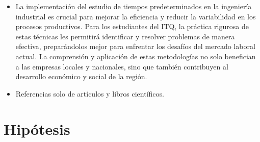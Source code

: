 \begin{itemize}
    \item La implementación del estudio de tiempos predeterminados en la ingeniería industrial es crucial para mejorar la eficiencia y reducir la variabilidad en los procesos productivos. Para los estudiantes del ITQ, la práctica rigurosa de estas técnicas les permitirá identificar y resolver problemas de manera efectiva, preparándolos mejor para enfrentar los desafíos del mercado laboral actual. La comprensión y aplicación de estas metodologías no solo benefician a las empresas locales y nacionales, sino que también contribuyen al desarrollo económico y social de la región.
    \cite{Niebel}
    
    \end{itemize}
    
    \begin{itemize}
    \item Referencias solo de artículos y libros científicos.
    \end{itemize}
    
    
    \section{Hipótesis}
    
